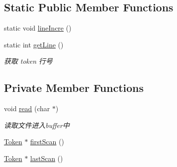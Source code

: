 \subsection*{Static Public Member Functions}
\begin{DoxyCompactItemize}
\item 
static void \hyperlink{class_lexer_a48478c1d6556ce949e7808bf3e2604b7}{line\+Incre} ()
\item 
static int \hyperlink{class_lexer_a0ede40225695d9eb9b42d275584cf8f0}{get\+Line} ()
\begin{DoxyCompactList}\small\item\em 获取 token 行号 \end{DoxyCompactList}\end{DoxyCompactItemize}
\subsection*{Private Member Functions}
\begin{DoxyCompactItemize}
\item 
void \hyperlink{class_lexer_abb0f5b7f1e6fd685c8c8e9074553c67f}{read} (char $\ast$)
\begin{DoxyCompactList}\small\item\em 读取文件进入buffer中 \end{DoxyCompactList}\item 
\hyperlink{class_token}{Token} $\ast$ \hyperlink{class_lexer_aa5f52af80cfc8de7841d2ac6bc736662}{first\+Scan} ()
\item 
\hyperlink{class_token}{Token} $\ast$ \hyperlink{class_lexer_a28eb3e3a349bcbc7a0b03e16bb42192f}{last\+Scan} ()
\end{DoxyCompactItemize}
